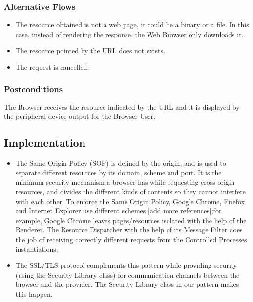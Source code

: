 \documentclass[prodmode,hillsideplop]{acmlarge}
\begin{document}
\subsubsection{Alternative Flows}
\begin{itemize}
	\item The resource obtained is not a web page, it could be a binary or a file. In this case, instead of rendering the response, the Web Browser only downloads it.
   \item The resource pointed by the URL does not exists.
   \item The request is cancelled.

\end{itemize}

\subsubsection{Postconditions}
The Browser receives the resource indicated by the URL and it is displayed by the peripheral device output for the Browser User.

\subsection{Implementation}
\begin{itemize}
	\item The Same Origin Policy (SOP) \cite{Zalewsk082} is defined by the origin, and is used to separate different resources by its domain, scheme and port. It is the minimum security mechanism a browser has while requesting cross-origin resources, and divides the different kinds of contents so they cannot interfere with each other. To enforce the Same Origin Policy, Google Chrome, Firefox and Internet Explorer use different schemes \cite{Barth2010,Grier2008} [add more references];for example, Google Chrome leaves pages/resources isolated with the help of the Renderer. The Resource Dispatcher with the help of its Message Filter does the job of receiving correctly different requests from the Controlled Processes instantiations.
    \item The SSL/TLS protocol complements this pattern while providing security (using the Security Library class) for communication channels between the browser and the provider. The Security Library class in our pattern makes this happen.
\end{itemize} 
\end{document}
